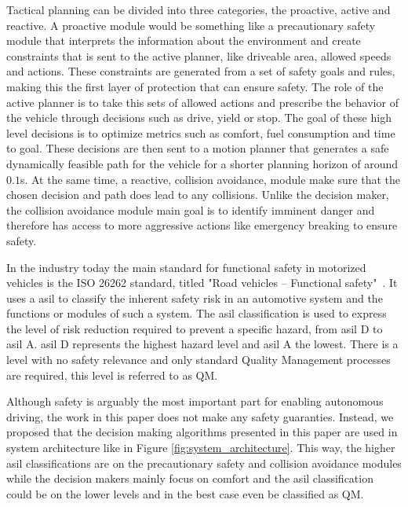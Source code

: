 Tactical planning can be divided into three categories, the proactive, active and reactive. A proactive module would be something like a precautionary safety module that interprets the information about the environment and create constraints that is sent to the active planner, like  driveable area, allowed speeds and actions. These constraints are generated from a set of safety goals and rules, making this the first layer of protection that can ensure safety. 
The role of the active planner is to take this sets of allowed actions and prescribe the behavior of the vehicle through decisions such as drive, yield or stop. The goal of these high level decisions is to optimize metrics such as comfort, fuel consumption and time to goal. These decisions are then sent to a motion planner that generates a safe dynamically feasible path for the vehicle for a shorter planning horizon of around $0.1$s. 
At the same time, a reactive, collision avoidance, module make sure that the chosen decision and path does lead to any collisions. Unlike the decision maker, the collision avoidance module main goal is to identify imminent danger and therefore has access to more aggressive actions like emergency breaking to ensure safety. 
 
In the industry today the main standard for functional safety in motorized vehicles is the ISO 26262 standard, titled "Road vehicles – Functional safety"~\cite{ISO26262}. It uses a \gls{asil} to classify the inherent safety risk in an automotive system and the functions or modules of such a system. The \gls{asil} classification is used to express the level of risk reduction required to prevent a specific hazard, from \gls{asil} D to \gls{asil} A. \gls{asil} D represents the highest hazard level and \gls{asil} A the lowest. There is a level with no safety relevance and only standard Quality Management processes are required, this level is referred to as QM.

Although safety is arguably the most important part for enabling autonomous driving, the work in this paper does not make any safety guaranties. 
Instead, we proposed that the decision making algorithms presented in this paper are used in system architecture like in Figure \ref{fig:system_architecture}. This way, the higher \gls{asil} classifications are on the precautionary safety and collision avoidance modules while the decision makers mainly focus on comfort and the \gls{asil} classification could be on the lower levels and in the best case even be classified as QM.


